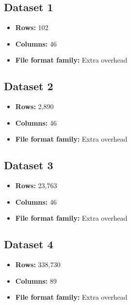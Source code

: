\subsection{Dataset 1}
\begin{itemize}
  \item \textbf{Rows:} 102
  \item \textbf{Columns:} 46
  \item \textbf{File format family:} Extra overhead
\end{itemize}

\subsection{Dataset 2}
\begin{itemize}
  \item \textbf{Rows:} 2,890
  \item \textbf{Columns:} 46
  \item \textbf{File format family:} Extra overhead
\end{itemize}

\subsection{Dataset 3}
\begin{itemize}
  \item \textbf{Rows:} 23,763
  \item \textbf{Columns:} 46
  \item \textbf{File format family:} Extra overhead
\end{itemize}

\subsection{Dataset 4}
\begin{itemize}
  \item \textbf{Rows:} 338,730
  \item \textbf{Columns:} 89
  \item \textbf{File format family:} Extra overhead
\end{itemize}

